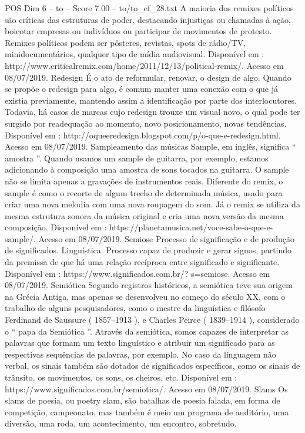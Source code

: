 \begin{textsample}{POS Dim 6 – to – Score 7.00 – to/to\_ef\_28.txt}
A maioria dos remixes políticos são críticas das estruturas de poder, destacando injustiças ou chamadas à ação, boicotar empresas ou indivíduos ou participar de movimentos de protesto.
Remixes políticos podem ser pôsteres, revistas, spots de rádio/TV, minidocumentários, qualquer tipo de mídia audiovisual.
Disponível em : http://www.criticalremix.com/home/2011/12/13/political-remix/.
Acesso em 08/07/2019.
Redesign É o ato de reformular, renovar, o design de algo.
Quando se propõe o redesign para algo, é comum manter uma conexão com o que já existia previamente, mantendo assim a identificação por parte dos interlocutores.
Todavia, há casos de marcas cujo redesign trouxe um visual novo, o qual pode ter surgido por readequação ao momento, novo posicionamento, novas tendências.
Disponível em : http://oqueeredesign.blogspot.com/p/o-que-e-redesign.html.
Acesso em 08/07/2019.
Sampleamento das músicas Sample, em inglês, significa “ amostra ”.
Quando usamos um sample de guitarra, por exemplo, estamos adicionando à composição uma amostra de sons tocados na guitarra.
O sample não se limita apenas a gravações de instrumentos reais.
Diferente do remix, o sample é como o recorte de algum trecho de determinada música, usado para criar uma nova melodia com uma nova roupagem do som.
Já o remix se utiliza da mesma estrutura sonora da música original e cria uma nova versão da mesma composição.
Disponível em : https://planetamusica.net/voce-sabe-o-que-e-sample/.
Acesso em 08/07/2019.
Semiose Processo de significação e de produção de significados.
Linguística.
Processo capaz de produzir e gerar signos, partindo da premissa de que há uma relação recíproca entre significado e significante.
Disponível em : https://www.significados.com.br/? s=semiose.
Acesso em 08/07/2019.
Semiótica Segundo registros históricos, a semiótica teve sua origem na Grécia Antiga, mas apenas se desenvolveu no começo do século XX, com o trabalho de alguns pesquisadores, como o mestre da linguística e filósofo Ferdinand de Saussure ( 1857–1913 ), e Charles Peirce ( 1839–1914 ), considerado o “ papa da Semiótica ”.
Através da semiótica, somos capazes de interpretar as palavras que formam um texto linguístico e atribuir um significado para as respectivas sequências de palavras, por exemplo.
No caso da linguagem não verbal, os sinais também são dotados de significados específicos, como os sinais de trânsito, os movimentos, os sons, os cheiros, etc.
Disponível em : https://www.significados.com.br/semiotica/.
Acesso em 08/07/2019.
Slams Os slams de poesia, ou poetry slam, são batalhas de poesia falada, em forma de competição, campeonato, mas também é meio um programa de auditório, uma diversão, uma roda, um acontecimento, um encontro, sobretudo.

\end{textsample}
